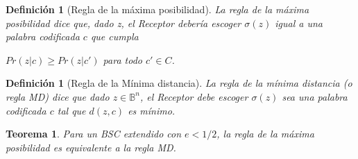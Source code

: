 \documentclass{beamer}
\theoremstyle{plain}
\newtheorem{teorema} [Teorema] {Teorema}
\newtheorem{definicion} [Definicion]{Definición}
\theoremstyle{example}
\theoremstyle{example}
\begin{document}
\begin{frame}  \footnotesize

\begin{definicion}[Regla de la máxima posibilidad]
La regla de la máxima posibilidad dice que, dado z, el Receptor debería escoger $\sigma(z)$ igual a una palabra codificada $c$ que cumpla 

\begin{center}
$Pr(z|c) \geq Pr(z|c')$ para todo $c' \in C$.
\end{center}
\end{definicion}


\begin{definicion}[Regla de la Mínima distancia]
La regla de la mínima distancia (o regla MD) dice que dado $z \in \mathbb{B}^n$, el Receptor debe escoger  $\sigma(z)$ sea una palabra codificada $c$ tal que $d(z,c)$ es mínimo. 
\end{definicion}

\begin{teorema}
Para un BSC extendido con $e < 1/2$, la regla de la máxima posibilidad es equivalente a la regla MD.
\end{teorema}






\end{frame} 
\end{document}
